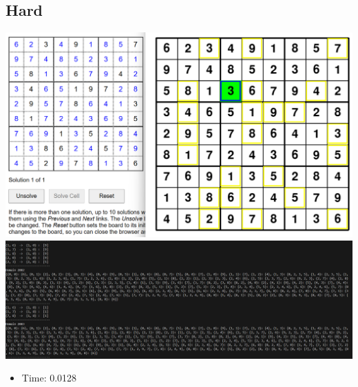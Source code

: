 \documentclass{article}
\begin{document}
\subsection*{Hard}
\begin{center}
    \includegraphics[width=0.8\linewidth]{VeryHard.png}
    \includegraphics[width=0.8\linewidth]{VeryHard_sample.png}
\end{center}
\begin{itemize}
    \item Time: 0.0128
\end{itemize}
\end{document}
